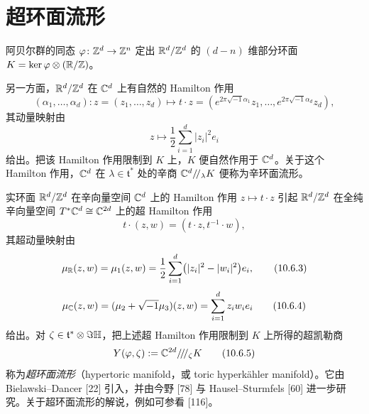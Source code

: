 

\section{超环面流形}

阿贝尔群的同态 $\varphi\colon\mathbb{Z}^d\to\mathbb{Z}^n$ 定出 $\mathbb{R}^d/\mathbb{Z}^d$ 的 $(d-n)$ 维部分环面 $K=\ker\varphi\otimes(\mathbb{R}/\mathbb{Z})$。

另一方面，$\mathbb{R}^d/\mathbb{Z}^d$ 在 $\mathbb{C}^d$ 上有自然的 Hamilton 作用
\begin{equation*}
  (\alpha_1,\dots,\alpha_d)\colon z=(z_1,\dots,z_d)
  \mapsto t\cdot z=(e^{2\pi\sqrt{-1}\alpha_1}z_1,\dots,e^{2\pi\sqrt{-1}\alpha_d}z_d),
\end{equation*}
其动量映射由
\begin{equation}
  z\mapsto\frac{1}{2}\sum_{i=1}^d|z_i|^2e_i \tag{10.6.1}
\end{equation}
给出。把该 Hamilton 作用限制到 $K$ 上，$K$ 便自然作用于 $\mathbb{C}^d$。关于这个 Hamilton 作用，$\mathbb{C}^d$ 在 $\lambda\in\mathfrak{t}^*$ 处的辛商 $\mathbb{C}^d/\!/_\lambda K$ 便称为辛环面流形。

实环面 $\mathbb{R}^d/\mathbb{Z}^d$ 在辛向量空间 $\mathbb{C}^d$ 上的 Hamilton 作用 $z\mapsto t\cdot z$ 引起 $\mathbb{R}^d/\mathbb{Z}^d$ 在全纯辛向量空间 $T^*\mathbb{C}^d\cong\mathbb{C}^{2d}$ 上的超 Hamilton 作用
\begin{equation}
  t\cdot(z,w)=(t\cdot z,t^{-1}\cdot w), \tag{10.6.2}
\end{equation}
其超动量映射由
\begin{equation}
  \mu_{\mathbb{R}}(z,w)=\mu_1(z,w)=\frac{1}{2}\sum_{i=1}^d\bigl(|z_i|^2-|w_i|^2\bigr)e_i, \tag{10.6.3}
\end{equation}
\begin{equation}
  \mu_{\mathbb{C}}(z,w)=(\mu_2+\sqrt{-1}\mu_3)(z,w)=\sum_{i=1}^d z_iw_ie_i \tag{10.6.4}
\end{equation}
给出。对 $\zeta\in\mathfrak{t}^*\otimes\Im\mathbb{H}$，把上述超 Hamilton 作用限制到 $K$ 上所得的超凯勒商
\begin{equation}
  Y(\varphi,\zeta):=\mathbb{C}^{2d}/\!/\!/_\zeta K \tag{10.6.5}
\end{equation}
称为\emph{超环面流形}（hypertoric manifold，或 toric hyperkähler manifold）。它由 Bielawski--Dancer [22] 引入，并由今野 [78] 与 Hausel--Sturmfels [60] 进一步研究。关于超环面流形的解说，例如可参看 [116]。

